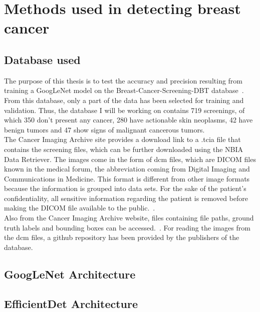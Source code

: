 \chapter{Methods used in detecting breast cancer}
\label{chap:ch4}
\section{Database used}

The purpose of this thesis is to test the accuracy and precision resulting from training a GoogLeNet model on the Breast-Cancer-Screening-DBT database~\cite{link4}. From this database, only a part of the data has been selected for training and validation. Thus, the database I will be working on contains 719 screenings, of which 350 don't present any cancer, 280 have actionable skin neoplasms, 42 have benign tumors and 47 show signs of malignant cancerous tumors.\\
The Cancer Imaging Archive site provides a download link to a .tcia file that contains the screening files, which can be further downloaded using the NBIA Data Retriever. The images come in the form of dcm files, which are DICOM files known in the medical forum, the abbreviation coming from Digital Imaging and Communications in Medicine.
This format is different from other image formats because the information is grouped into data sets. For the sake of the patient's confidentiality, all sensitive information regarding the patient is removed before making the DICOM file available to the public.~\cite{carte6}.\\
Also from the Cancer Imaging Archive website, files containing file paths, ground truth labels and bounding boxes can be accessed.~\cite{carte7}. For reading the images from the dcm files, a github repository has been provided by the publishers of the database.~\cite{link5}

\section{GoogLeNet Architecture}

\section{EfficientDet Architecture}

